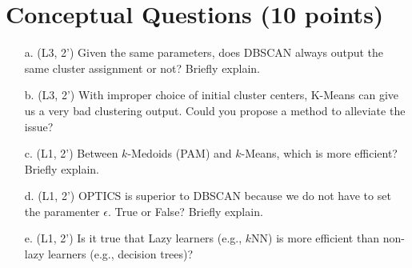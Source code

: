 \section{Conceptual Questions (10 points)}
\begin{itemize}
\item[a.]  (L3, 2') Given the same parameters, does DBSCAN always output the same cluster assignment or not? Briefly explain.
\item[b.]  (L3, 2') With improper choice of initial cluster centers, K-Means can give us a very bad clustering output. Could you propose a method to alleviate the issue?
\item[c.]  (L1, 2') Between $k$-Medoids (PAM) and $k$-Means, which is more efficient? Briefly explain.
\item[d.]  (L1, 2') OPTICS is superior to DBSCAN because we do not have to set the paramenter $\epsilon$. True or False? Briefly explain.
\item[e.] (L1, 2') Is it true that Lazy learners (e.g., $k$NN) is more efficient than non-lazy learners (e.g., decision trees)?
\end{itemize}
